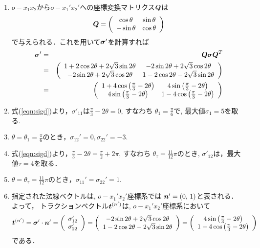 \documentclass[10pt,a4j]{jarticle}
\begin{document}
\begin{enumerate}
\item
$o-x_1x_2$から$o-x_1'x_2'$への座標変換マトリクス$\mbox{\boldmath $Q$}$は
\[
	\mbox{\boldmath $Q$}=\left(
		\begin{array}{cc}
			\cos \theta & \sin \theta \\
			-\sin\theta & \cos \theta
		\end{array}
	\right)
\]
で与えられる．これを用いて$\mbox{\boldmath $\sigma$}'$を計算すれば
\begin{eqnarray}
	\mbox{\boldmath $\sigma$} ' 
	&=& 
	\mbox{\boldmath $Q \sigma Q$}^T\\
	&=&
 	\left( 
 	\begin{array}{cc}
		1+ 2\cos 2\theta+2\sqrt{3} \sin 2 \theta & 
		-2\sin 2\theta +2\sqrt{3} \cos 2\theta \\
		-2\sin 2\theta +2\sqrt{3} \cos 2\theta &
		1- 2\cos 2\theta-2\sqrt{3} \sin 2 \theta
	\end{array}
	\right) \\
 &=&
 \left(
 	\begin{array}{cc}
		1+ 4 \cos \left( \frac{\pi}{3} -2\theta\right) & 4\sin \left(\frac{\pi}{3} -2 \theta\right) \\
		4\sin \left(\frac{\pi}{3} -2 \theta\right) &1- 4 \cos \left( \frac{\pi}{3} -2\theta\right)   \\
 	\end{array}
 \right)
	\label{eqn:sigd}
\end{eqnarray}
\item
	式(\ref{eqn:sigd})より，$\sigma'_{11}$は$\frac{\pi}{3} -2\theta=0$, すなわち
	$\theta_1=\frac{\pi}{6}$で, 最大値$\sigma_1=5$を取る.
\item
	$\theta=\theta_1=\frac{\pi}{6}$のとき，$\sigma_{12}'=0,\sigma_{22}'=-3$.
\item
	式(\ref{eqn:sigd})より，$\frac{\pi}{3}-2\theta=\frac{\pi}{2}+2\pi$, すなわち
	$\theta_\tau=\frac{11}{12}\pi$のとき, $\sigma'_{12}$は，最大値$\tau=4$を取る．
\item
	$\theta=\theta_{\tau}=\frac{11}{12}\pi$のとき，$\sigma_{11}'=\sigma_{22}'=1$.
\item
	指定された法線ベクトルは, $o-x_1'x_2'$座標系では
	$\mbox{\boldmath $n$}'=(0,\, 1)$と表される． よって，
	トラクションベクトル$\mbox{\boldmath $t$}^{(n')}$は, $o-x_1'x_2'$座標系において
	\begin{equation}
		\mbox{\boldmath $t$}^{(n')}= \mbox{\boldmath $\sigma$}' \cdot \mbox{\boldmath $n$}'
		= 
		\left( 
			\begin{array}{c} 
				\sigma_{12}' \\ 
				\sigma_{22}'
			\end{array}
		\right)
		=
		\left(
			\begin{array}{c}
			-2\sin 2\theta +2\sqrt{3} \cos 2\theta \\
			1- 2\cos 2\theta-2\sqrt{3} \sin 2 \theta
			\end{array}
		\right)
		=
		\left(
			\begin{array}{c}
			4\sin \left(\frac{\pi}{3} -2 \theta\right)\\
			1- 4 \cos \left( \frac{\pi}{3} -2\theta\right)
 		\end{array}
		\right) 
	\end{equation}
	である．
\end{enumerate}
\end{document}
